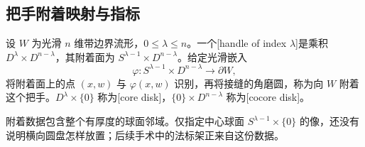 \subsection{把手附着映射与指标}
\label{g2:subsec:1702:03}
\begin{definition}\label{g2:def:morse-handle}
	设 \(W\) 为光滑 \(n\) 维带边界流形，\(0\le\lambda\le n\)。一个[handle of index \(\lambda\)]是乘积 \(D^\lambda\times D^{n-\lambda}\)，其附着面为 \(S^{\lambda-1}\times D^{n-\lambda}\)。给定光滑嵌入
	\[
		\varphi:S^{\lambda-1}\times D^{n-\lambda}\longrightarrow\partial W,
	\]
	将附着面上的点 \((x,w)\) 与 \(\varphi(x,w)\) 识别，再将接缝的角磨圆，称为向 \(W\) 附着这个把手。\(D^\lambda\times\{0\}\) 称为[core disk]，\(\{0\}\times D^{n-\lambda}\) 称为[cocore disk]。
\end{definition}

附着数据包含整个有厚度的球面邻域。仅指定中心球面 \(S^{\lambda-1}\times\{0\}\) 的像，还没有说明横向圆盘怎样放置；后续手术中的法标架正来自这份数据。


